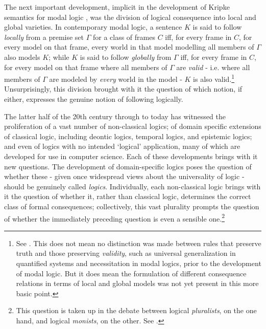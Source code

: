	The next important development, implicit in the development of Kripke semantics for modal logic \cite{Kripke1963a} \cite{Kripke1965}, was the division \textit{}of logical consequence into local and global varieties. In contemporary modal logic, a sentence $K$ is said to follow \textit{locally} from a premise set $\Gamma$  for a class of frames $C$ iff, for every frame in $C$, for every model on that frame, every world in that model modelling all members of $\Gamma$ also models $K$; while $K$ is said to follow \textit{globally} from $\Gamma$ iff, for every frame in $C$, for every model on that frame where all members of $\Gamma$ are \textit{valid} - i.e. where all members of $\Gamma$ are modeled by \textit{every} world in the model - $K$ is also valid.\footnote{See \cite[21-23]{Fitting1998} \cite[31-32]{Blackburn2001}. This does not mean no distinction was made between rules that preserve truth and those preserving \textit{validity}, such as universal generalization in quantified systems and necessitation in modal logics, prior to the development of modal logic. But it does mean the formulation of different consequence relations in terms of local and global models was not yet present in this more basic point.} Unsurprisingly, this division brought with it the question of which notion, if either, expresses the genuine notion of following logically.
	
	The latter half of the 20th century through to today has witnessed the proliferation of a vast number of non-classical logics; of domain specific extensions of classical logic, including deontic logics, temporal logics, and epistemic logics; and even of logics with no intended `logical' application, many of which are developed for use in computer science. Each of these developments brings with it new questions. The development of domain-specific logics poses the question of whether these - given once widespread views about the universality of logic - should be genuinely called \textit{logics}. Individually, each non-classical logic brings with it the question of whether it, rather than classical logic, determines the correct class of formal consequences;  collectively, this vast plurality prompts the question of whether the immediately preceding question is even a sensible one.\footnote{This question is taken up in the debate between logical \textit{pluralists}, on the one hand, and logical \textit{monists}, on the other. See \cite{BeallRestall2006} \cite{Griffiths2013}.}
	
